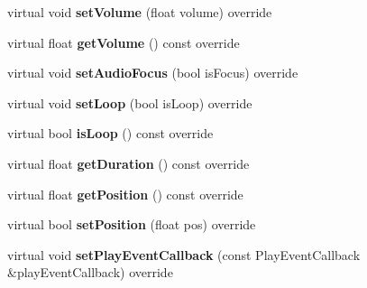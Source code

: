 \begin{DoxyCompactItemize}
\mbox{\label{classcocos2d_1_1experimental_1_1UrlAudioPlayer_aa29be0f3fb13f8c0357e4b36f9a973c4}} 
virtual void {\bfseries set\+Volume} (float volume) override
\item 
\mbox{\label{classcocos2d_1_1experimental_1_1UrlAudioPlayer_a4e0ca26fdc63eedcd901e2e654370250}} 
virtual float {\bfseries get\+Volume} () const override
\item 
\mbox{\label{classcocos2d_1_1experimental_1_1UrlAudioPlayer_a4be58e4ea2de85e6400ec98023d5bb39}} 
virtual void {\bfseries set\+Audio\+Focus} (bool is\+Focus) override
\item 
\mbox{\label{classcocos2d_1_1experimental_1_1UrlAudioPlayer_a4aff39e3dde993a10dfc1bbeef8a445e}} 
virtual void {\bfseries set\+Loop} (bool is\+Loop) override
\item 
\mbox{\label{classcocos2d_1_1experimental_1_1UrlAudioPlayer_a9ce41a7004a5841b672198fd6fdfbca7}} 
virtual bool {\bfseries is\+Loop} () const override
\item 
\mbox{\label{classcocos2d_1_1experimental_1_1UrlAudioPlayer_a305361a5c6e05b30f37867c33bf18178}} 
virtual float {\bfseries get\+Duration} () const override
\item 
\mbox{\label{classcocos2d_1_1experimental_1_1UrlAudioPlayer_afed8cb54b78695d1b685a4d11000b56a}} 
virtual float {\bfseries get\+Position} () const override
\item 
\mbox{\label{classcocos2d_1_1experimental_1_1UrlAudioPlayer_a68b2cf53e5015f97aed1d1713f1212b1}} 
virtual bool {\bfseries set\+Position} (float pos) override
\item 
\mbox{\label{classcocos2d_1_1experimental_1_1UrlAudioPlayer_abdfb2c6663d2a9f5c6687461a4ed3ee5}} 
virtual void {\bfseries set\+Play\+Event\+Callback} (const Play\+Event\+Callback \&play\+Event\+Callback) override
\end{DoxyCompactItemize}
